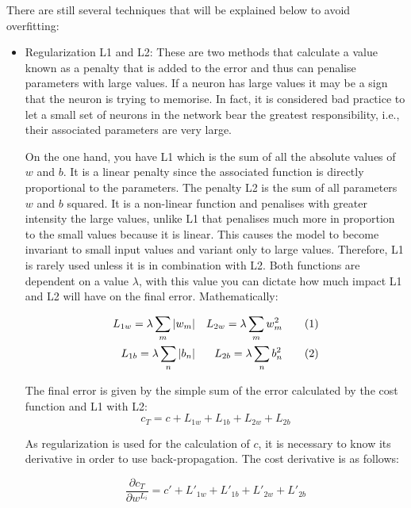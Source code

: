 There are still several techniques that will be explained below to avoid overfitting: 
\begin{itemize}
    \item Regularization L1 and L2:
    These are two methods that calculate a value known as a penalty that is added to the error and thus can penalise parameters with large values. If a neuron has large values it may be a sign that the neuron is trying to memorise. In fact, it is considered bad practice to let a small set of neurons in the network bear the greatest responsibility, i.e., their associated parameters are very large.
    \newline
    
On the one hand, you have L1 which is the sum of all the absolute values of $w$ and $b$. It is a linear penalty since the associated function is directly proportional to the parameters. The penalty L2 is the sum of all parameters $w$ and $b$ squared. It is a non-linear function and penalises with greater intensity the large values, unlike L1 that penalises much more in proportion to the small values because it is linear. This causes the model to become invariant to small input values and variant only to large values. Therefore, L1 is rarely used unless it is in combination with L2. Both functions are dependent on a value $\lambda$, with this value you can dictate how much impact L1 and L2 will have on the final error. Mathematically:
    
    \begin{align*}
         L_{1w} = \lambda \sum_m |w_m| &&  L_{2w} = \lambda \sum_m w^2_m \addtocounter{equation}{1}\tag{\theequation} \\ 
         L_{1b} =\lambda \sum_n |b_n| && L_{2b} = \lambda \sum_n b^2_n \addtocounter{equation}{1}\tag{\theequation}
    \end{align*}
    
The final error is given by the simple sum of the error calculated by the cost function and L1 with L2:
    \begin{equation}
        c_T = c + L_{1w} + L_{1b} + L_{2w} + L_{2b}
    \end{equation}

As regularization is used for the calculation of $c$, it is necessary to know its derivative in order to use back-propagation. The cost derivative is as follows:
    
    \begin{equation}
        \frac{\partial c_T}{\partial w^{L_i}} = c' + L'_{1w} + L'_{1b} + L'_{2w} + L'_{2b}
    \end{equation}
    

\end{itemize}
